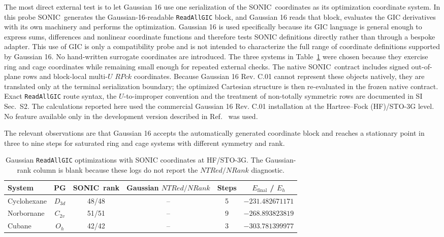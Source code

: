 \documentclass[journal=jctcce,manuscript=article,layout=traditional]{achemso}
\newcommand{\SONIC}{SONIC}
\theoremstyle{definition}
\begin{document}
The most direct external test is to let Gaussian 16 use one serialization of the
\SONIC\ coordinates as its optimization coordinate system.  In this probe
\SONIC\ generates the Gaussian-16-readable \texttt{ReadAllGIC} block, and
Gaussian 16 reads that block,
evaluates the GIC derivatives with its own machinery and performs the
optimization.  Gaussian 16 is used specifically because its GIC language is
general enough to express sums, differences and nonlinear coordinate functions
and therefore tests SONIC definitions directly rather than through a bespoke
adapter.  This use of GIC is only a compatibility probe and is not intended to
characterize the full range of coordinate definitions supported by Gaussian 16.
No hand-written surrogate coordinates are introduced.  The three
systems in Table~\ref{tab:readallgic-opt} were chosen because they exercise
ring and cage coordinates while remaining small enough for repeated external
checks.  The native \SONIC\ contract includes signed out-of-plane rows and
block-local multi-\(U\) \(RPck\) coordinates.  Because Gaussian 16 Rev. C.01
cannot represent these objects natively, they are translated only at the
terminal serialization boundary; the optimized Cartesian structure is then
re-evaluated in the frozen native contract.  Exact \texttt{ReadAllGIC} route
syntax, the \(U\)-to-improper convention and the treatment of non-totally
symmetric rows are documented in SI Sec.~S2.  The calculations reported here
used the commercial Gaussian 16 Rev. C.01 installation at the Hartree--Fock
(HF)/STO-3G level.  No feature
available only in the development version described in
Ref.~ was used.

The relevant observations are that Gaussian 16 accepts the automatically
generated coordinate block and reaches a stationary point in three to nine
steps for saturated ring and cage systems with different symmetry and rank.

\begin{table}[htbp]
\centering
\caption{Gaussian \texttt{ReadAllGIC} optimizations with SONIC coordinates at
HF/STO-3G.  The Gaussian-rank column is blank because these logs do not report
the \(NTRed/NRank\) diagnostic.}
\label{tab:readallgic-opt}
\begin{tabular}{lccccc}
\toprule
System & PG & \SONIC\ rank & Gaussian \(NTRed/NRank\) & Steps & \(E_\mathrm{final}\) / \(E_h\) \\
\midrule
Cyclohexane & \(D_{3d}\) & 48/48 & -- & 5 & \(-231.482671171\) \\
Norbornane & \(C_{2v}\) & 51/51 & -- & 9 & \(-268.893823819\) \\
Cubane & \(O_h\) & 42/42 & -- & 3 & \(-303.781399977\) \\
\bottomrule
\end{tabular}
\end{table}
\end{document}
